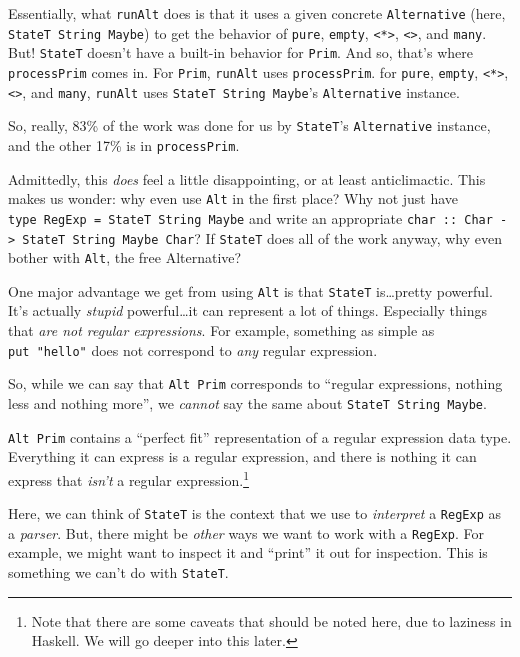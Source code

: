 \documentclass[]{article}
\begin{document}
Essentially, what \texttt{runAlt} does is that it uses a given concrete
\texttt{Alternative} (here, \texttt{StateT\ String\ Maybe}) to get the behavior
of \texttt{pure}, \texttt{empty}, \texttt{\textless{}*\textgreater{}},
\texttt{\textless{}\textbar{}\textgreater{}}, and \texttt{many}. But!
\texttt{StateT} doesn't have a built-in behavior for \texttt{Prim}. And so,
that's where \texttt{processPrim} comes in. For \texttt{Prim}, \texttt{runAlt}
uses \texttt{processPrim}. for \texttt{pure}, \texttt{empty},
\texttt{\textless{}*\textgreater{}},
\texttt{\textless{}\textbar{}\textgreater{}}, and \texttt{many}, \texttt{runAlt}
uses \texttt{StateT\ String\ Maybe}'s \texttt{Alternative} instance.

So, really, 83\% of the work was done for us by \texttt{StateT}'s
\texttt{Alternative} instance, and the other 17\% is in \texttt{processPrim}.

Admittedly, this \emph{does} feel a little disappointing, or at least
anticlimactic. This makes us wonder: why even use \texttt{Alt} in the first
place? Why not just have \texttt{type\ RegExp\ =\ StateT\ String\ Maybe} and
write an appropriate
\texttt{char\ ::\ Char\ -\textgreater{}\ StateT\ String\ Maybe\ Char}? If
\texttt{StateT} does all of the work anyway, why even bother with \texttt{Alt},
the free Alternative?

One major advantage we get from using \texttt{Alt} is that \texttt{StateT}
is\ldots{}pretty powerful. It's actually \emph{stupid} powerful\ldots{}it can
represent a lot of things. Especially things that \emph{are not regular
expressions}. For example, something as simple as \texttt{put\ "hello"} does not
correspond to \emph{any} regular expression.

So, while we can say that \texttt{Alt\ Prim} corresponds to ``regular
expressions, nothing less and nothing more'', we \emph{cannot} say the same
about \texttt{StateT\ String\ Maybe}.

\texttt{Alt\ Prim} contains a ``perfect fit'' representation of a regular
expression data type. Everything it can express is a regular expression, and
there is nothing it can express that \emph{isn't} a regular
expression.\footnote{Note that there are some caveats that should be noted here,
  due to laziness in Haskell. We will go deeper into this later.}

Here, we can think of \texttt{StateT} is the context that we use to
\emph{interpret} a \texttt{RegExp} as a \emph{parser}. But, there might be
\emph{other} ways we want to work with a \texttt{RegExp}. For example, we might
want to inspect it and ``print'' it out for inspection. This is something we
can't do with \texttt{StateT}.
\end{document}

